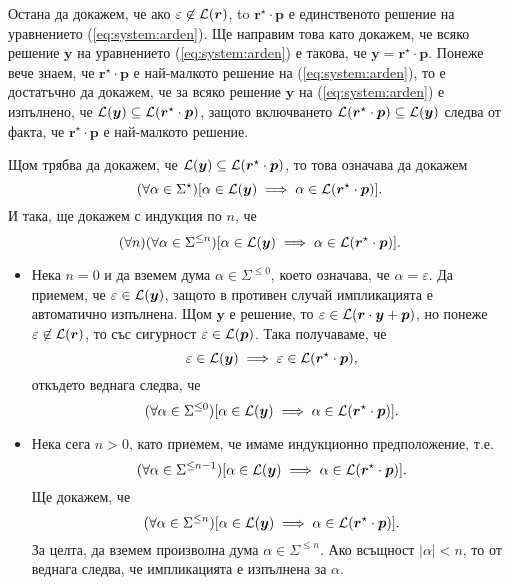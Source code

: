 \begin{hint}
  Остана да докажем, че ако $\varepsilon \not\in \mathcal{L}(\bm{r})$, to $\bm{r}^\star \cdot \bm{p}$ е единственото решение на уравнението (\ref{eq:system:arden}).
  Ще направим това като докажем, че всяко
  решение $\bm{y}$ на уравнението (\ref{eq:system:arden}) е такова, че $\bm{y} = \bm{r}^\star \cdot \bm{p}$.
  Понеже вече знаем, че $\bm{r}^\star \cdot \bm{p}$ е най-малкото решение на (\ref{eq:system:arden}), то е достатъчно да докажем, че за всяко решение $\bm{y}$ на (\ref{eq:system:arden}) е изпълнено, че
  $\mathcal{L}(\bm{y}) \subseteq \mathcal{L}(\bm{r}^\star \cdot \bm{p})$, защото включването $\mathcal{L}(\bm{r}^\star \cdot \bm{p}) \subseteq \mathcal{L}(\bm{y})$ следва от факта, че $\bm{r}^\star \cdot \bm{p}$ е най-малкото решение.

  Щом трябва да докажем, че $\mathcal{L}(\bm{y}) \subseteq \mathcal{L}(\bm{r}^\star \cdot \bm{p})$,
  то това означава да докажем
  \[(\forall \alpha \in \Sigma^\star)[\alpha \in \mathcal{L}(\bm{y}) \implies \alpha \in \mathcal{L}(\bm{r}^\star \cdot \bm{p})].\]
  И така, ще докажем с индукция по $n$, че
  \[(\forall n)(\forall \alpha \in \Sigma^{\leq n})[\alpha \in \mathcal{L}(\bm{y}) \implies \alpha \in \mathcal{L}(\bm{r}^\star \cdot \bm{p})].\]
  \begin{itemize}
  \item
    Нека $n = 0$ и да вземем дума $\alpha \in \Sigma^{\leq 0}$, което означава, че $\alpha = \varepsilon$.
    Да приемем, че $\varepsilon \in \mathcal{L}(\bm{y})$, защото в противен случай импликацията е автоматично изпълнена.
    Щом $\bm{y}$ е решение, то $\varepsilon \in \mathcal{L}(\bm{r} \cdot \bm{y} + \bm{p})$,
    но понеже $\varepsilon \not \in \mathcal{L}(\bm{r})$, то със сигурност $\varepsilon \in \mathcal{L}(\bm{p})$.
    Така получаваме, че
    \[\varepsilon \in \mathcal{L}(\bm{y}) \implies \varepsilon\in\mathcal{L}(\bm{r}^\star \cdot \bm{p}),\]
    откъдето веднага следва, че
    \[(\forall \alpha \in \Sigma^{\leq 0})[\alpha \in \mathcal{L}(\bm{y}) \implies \alpha \in \mathcal{L}(\bm{r}^\star \cdot \bm{p})].\]
  \item
    Нека сега $n > 0$, като приемем, че имаме индукционно предположение, т.е.
    \[(\forall \alpha \in \Sigma^{\leq n-1})[\alpha \in \mathcal{L}(\bm{y}) \implies \alpha \in \mathcal{L}(\bm{r}^\star \cdot \bm{p})].\]
    Ще докажем, че
    \[(\forall \alpha \in \Sigma^{\leq n})[\alpha \in \mathcal{L}(\bm{y}) \implies \alpha \in \mathcal{L}(\bm{r}^\star \cdot \bm{p})].\]
    За целта, да вземем произволна дума $\alpha \in \Sigma^{\leq n}$.
    Ако всъщност $|\alpha| < n$, то от \IndHyp веднага следва, че импликацията е изпълнена за $\alpha$.


\end{itemize}
\end{hint}
